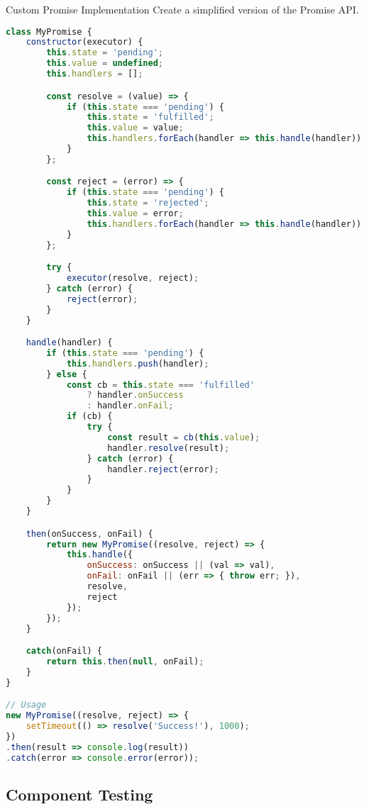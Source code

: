 \begin{example2}{Custom Promise Implementation}
Create a simplified version of the Promise API.

\begin{lstlisting}[language=JavaScript, style=basesmol]
class MyPromise {
    constructor(executor) {
        this.state = 'pending';
        this.value = undefined;
        this.handlers = [];

        const resolve = (value) => {
            if (this.state === 'pending') {
                this.state = 'fulfilled';
                this.value = value;
                this.handlers.forEach(handler => this.handle(handler));
            }
        };

        const reject = (error) => {
            if (this.state === 'pending') {
                this.state = 'rejected';
                this.value = error;
                this.handlers.forEach(handler => this.handle(handler));
            }
        };

        try {
            executor(resolve, reject);
        } catch (error) {
            reject(error);
        }
    }

    handle(handler) {
        if (this.state === 'pending') {
            this.handlers.push(handler);
        } else {
            const cb = this.state === 'fulfilled' 
                ? handler.onSuccess 
                : handler.onFail;
            if (cb) {
                try {
                    const result = cb(this.value);
                    handler.resolve(result);
                } catch (error) {
                    handler.reject(error);
                }
            }
        }
    }

    then(onSuccess, onFail) {
        return new MyPromise((resolve, reject) => {
            this.handle({
                onSuccess: onSuccess || (val => val),
                onFail: onFail || (err => { throw err; }),
                resolve,
                reject
            });
        });
    }

    catch(onFail) {
        return this.then(null, onFail);
    }
}

// Usage
new MyPromise((resolve, reject) => {
    setTimeout(() => resolve('Success!'), 1000);
})
.then(result => console.log(result))
.catch(error => console.error(error));
\end{lstlisting}
\end{example2}

\subsection{Component Testing}

